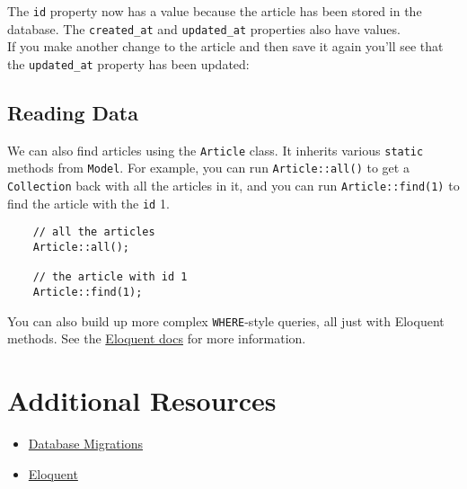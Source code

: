 
The \texttt{id} property now has a value because the article has been stored in the database. The \texttt{created\_at} and \texttt{updated\_at} properties also have values.
\\

If you make another change to the article and then save it again you'll see that the \texttt{updated\_at} property has been updated:



\subsection{Reading Data}

We can also find articles using the \texttt{Article} class. It inherits various \texttt{static} methods from \texttt{Model}. For example, you can run \texttt{Article::all()} to get a \texttt{Collection} back with all the articles in it, and you can run \texttt{Article::find(1)} to find the article with the \texttt{id} 1.

\begin{verbatim}
    // all the articles
    Article::all();

    // the article with id 1
    Article::find(1);
\end{verbatim}

You can also build up more complex \texttt{WHERE}-style queries, all just with Eloquent methods. See the \href{http://laravel.com/docs/master/eloquent}{Eloquent docs} for more information.



\section{Additional Resources}

\begin{itemize}[leftmargin=*]
    \item \href{http://laravel.com/docs/master/migrations}{Database Migrations}
    \item \href{http://laravel.com/docs/master/eloquent}{Eloquent}
\end{itemize}
